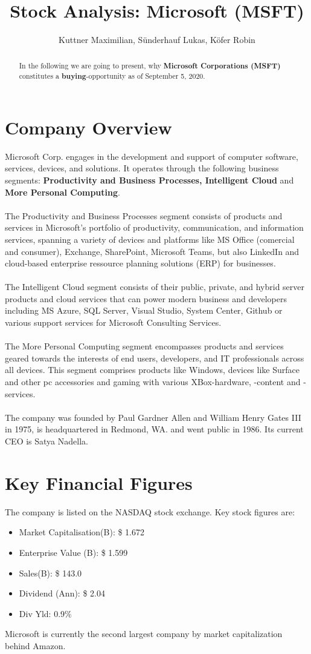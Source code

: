 \documentclass[]{article}
\title{Stock Analysis: Microsoft (MSFT)}
\author{Kuttner Maximilian, Sünderhauf Lukas, Köfer Robin}
\begin{document}
	
	\maketitle
	
	
	
	\begin{abstract}
		\noindent In the following we are going to present, why \textbf{Microsoft Corporations (MSFT)} constitutes a \textbf{buying}-opportunity as of September 5, 2020.
	\end{abstract}
	
	\section{Company Overview}
	Microsoft Corp. engages in the development and support of computer software, services, devices, and solutions. It operates through the following business segments: \textbf{Productivity and Business Processes, Intelligent Cloud} and \textbf{More Personal Computing}.\\\\
	The Productivity and Business Processes segment consists of products and services in Microsoft's portfolio of productivity, communication, and information services, spanning a variety of devices and platforms like MS Office (comercial and consumer), Exchange, SharePoint, Microsoft Teams, but also LinkedIn and cloud-based enterprise ressource planning solutions (ERP) for businesses.\\\\
	The Intelligent Cloud segment consists of their public, private, and hybrid server products and cloud services that can power modern business and developers including MS Azure, SQL Server, Visual Studio, System Center, Github or various support services for Microsoft Consulting Services.\\\\
	The More Personal Computing segment encompasses products and services geared towards the interests of end users, developers, and IT professionals across all devices. This segment comprises products like Windows, devices like Surface and other pc accessories and gaming with various XBox-hardware, -content and -services.\\\\
	The company was founded by Paul Gardner Allen and William Henry Gates III in 1975, is headquartered in Redmond, WA. and went public in 1986. Its current CEO is Satya Nadella.\cite{wiki:xxx}
	\clearpage
	\section{Key Financial Figures}
	The company is listed on the NASDAQ stock exchange. Key stock figures are:
	\begin{itemize}
		\item Market Capitalisation(B): \$ 1.672
		\item Enterprise Value (B): \$ 1.599
		\item Sales(B): \$ 143.0
		\item Dividend (Ann): \$ 2.04
		\item Div Yld: 0.9\%
	\end{itemize}
	Microsoft is currently the second largest company by market capitalization behind Amazon.
\end{document}
